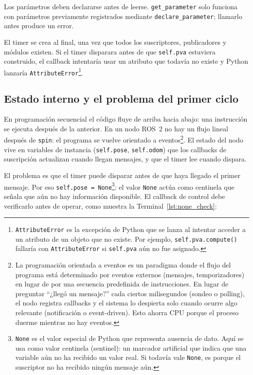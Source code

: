 Los parámetros deben declararse antes de leerse. \texttt{get\_parameter} solo funciona con parámetros previamente registrados mediante \texttt{declare\_parameter}; llamarlo antes produce un error.

El timer se crea al final, una vez que todos los suscriptores, publicadores y módulos existen. Si el timer disparara antes de que \texttt{self.pva} estuviera construido, el callback intentaría usar un atributo que todavía no existe y Python lanzaría \texttt{AttributeError}\footnote{\texttt{AttributeError} es la excepción de Python que se lanza al intentar acceder a un atributo de un objeto que no existe. Por ejemplo, \texttt{self.pva.compute()} fallaría con \texttt{AttributeError} si \texttt{self.pva} aún no fue asignado.}.

\subsection{Estado interno y el problema del primer ciclo}

En programación secuencial el código fluye de arriba hacia abajo: una instrucción se ejecuta después de la anterior. En un nodo ROS~2 no hay un flujo lineal después de \texttt{spin}: el programa se vuelve orientado a eventos\footnote{La programación orientada a eventos es un paradigma donde el flujo del programa está determinado por eventos externos (mensajes, temporizadores) en lugar de por una secuencia predefinida de instrucciones. En lugar de preguntar ``¿llegó un mensaje?'' cada ciertos milisegundos (sondeo o polling), el nodo registra callbacks y el sistema lo despierta solo cuando ocurre algo relevante (notificación o event-driven). Esto ahorra CPU porque el proceso duerme mientras no hay eventos.}. El estado del nodo vive en variables de instancia (\texttt{self.pose}, \texttt{self.odom}) que los callbacks de suscripción actualizan cuando llegan mensajes, y que el timer lee cuando dispara.

El problema es que el timer puede disparar antes de que haya llegado el primer mensaje. Por eso \texttt{self.pose = None}\footnote{\texttt{None} es el valor especial de Python que representa ausencia de dato. Aquí se usa como valor centinela (sentinel): un marcador artificial que indica que una variable aún no ha recibido un valor real. Si todavía vale \texttt{None}, es porque el suscriptor no ha recibido ningún mensaje aún.}: el valor \texttt{None} actúa como centinela que señala que aún no hay información disponible. El callback de control debe verificarlo antes de operar, como muestra la Terminal~\ref{lst:none_check}:

